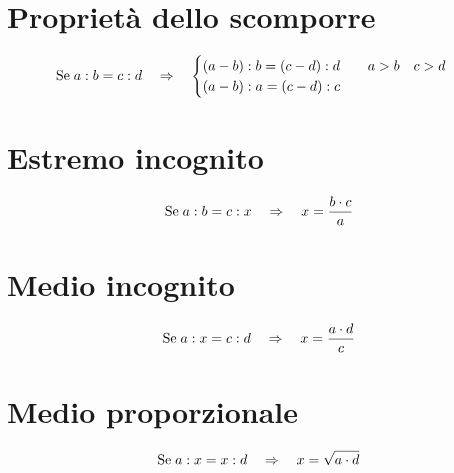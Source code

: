 \section{Proprietà dello scomporre}
\begin{equation*}                       
\text{Se\;}a:b=c:d\quad\Rightarrow\quad \begin{cases}
(a-b):b=(c-d):d\qquad a>b\quad c>d\\
(a-b):a=(c-d):c
\end{cases}
\end{equation*}
\section{Estremo incognito}
\begin{equation*}                       
\text{Se\;}a:b=c:x\quad\Rightarrow\quad x=\dfrac{b\cdot c}{a}
\end{equation*}
\section{Medio incognito}
\begin{equation*}                       
\text{Se\;}a:x=c:d\quad\Rightarrow\quad x=\dfrac{a\cdot d}{c}
\end{equation*}
\section{Medio proporzionale}
\begin{equation*}                       
\text{Se\;}a:x=x:d\quad\Rightarrow\quad x=\sqrt{a\cdot d}
\end{equation*}